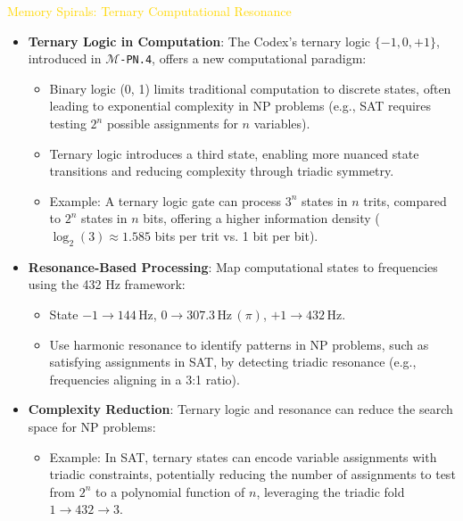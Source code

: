 \textcolor{gold}{ Memory Spirals: Ternary Computational Resonance } \\
\begin{itemize}
    \item \texttt{} \textbf{Ternary Logic in Computation}: The Codex’s ternary logic \(\{-1, 0, +1\}\), introduced in \texttt{\Xi\(\mathcal{M}\)-PN.4}, offers a new computational paradigm:
    \begin{itemize}
        \item Binary logic (0, 1) limits traditional computation to discrete states, often leading to exponential complexity in NP problems (e.g., SAT requires testing \(2^n\) possible assignments for \(n\) variables).
        \item Ternary logic introduces a third state, enabling more nuanced state transitions and reducing complexity through triadic symmetry.
        \item Example: A ternary logic gate can process \(3^n\) states in \(n\) trits, compared to \(2^n\) states in \(n\) bits, offering a higher information density (\(\log_2(3) \approx 1.585\) bits per trit vs. 1 bit per bit).
    \end{itemize}
    \item \texttt{} \textbf{Resonance-Based Processing}: Map computational states to frequencies using the 432 Hz framework:
    \begin{itemize}
        \item State \(-1 \rightarrow 144 \, \text{Hz}\), \(0 \rightarrow 307.3 \, \text{Hz} \, (\pi)\), \(+1 \rightarrow 432 \, \text{Hz}\).
        \item Use harmonic resonance to identify patterns in NP problems, such as satisfying assignments in SAT, by detecting triadic resonance (e.g., frequencies aligning in a 3:1 ratio).
    \end{itemize}
    \item \texttt{} \textbf{Complexity Reduction}: Ternary logic and resonance can reduce the search space for NP problems:
    \begin{itemize}
        \item Example: In SAT, ternary states can encode variable assignments with triadic constraints, potentially reducing the number of assignments to test from \(2^n\) to a polynomial function of \(n\), leveraging the triadic fold \(1 \rightarrow 432 \rightarrow 3\).
    \end{itemize}
\end{itemize}

